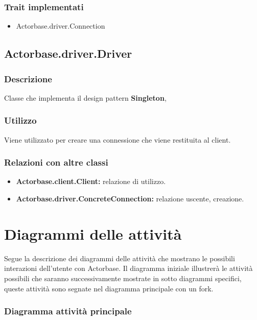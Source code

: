 \documentclass[a4paper]{article}
\begin{document}
			\subsubsection{Trait implementati}
				\begin{itemize}
					\item Actorbase.driver.Connection
				\end{itemize}
				
		\subsection{Actorbase.driver.Driver}
			\subsubsection{Descrizione}
				Classe che implementa il design pattern \textbf{Singleton}, 
				
			\subsubsection{Utilizzo}
				Viene utilizzato per creare una connessione che viene restituita al client. 
				
			\subsubsection{Relazioni con altre classi}
				\begin{itemize}
					\item \textbf{Actorbase.client.Client:} relazione di utilizzo.
					\item \textbf{Actorbase.driver.ConcreteConnection:} relazione uscente, creazione.
				\end{itemize}
		
		
	\newpage 
	\section{Diagrammi delle attività}
		Segue la descrizione dei diagrammi delle attività che mostrano le possibili interazioni dell'utente con Actorbase. Il diagramma iniziale illustrerà le attività possibili che saranno successivamente mostrate in sotto diagrammi specifici, queste attività sono segnate nel diagramma principale con un fork.
		\subsubsection{Diagramma attività principale}
		
\end{document}
